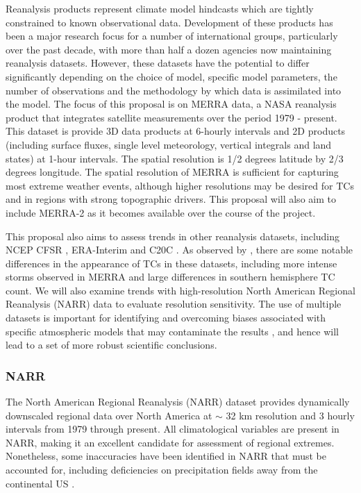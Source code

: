 \documentclass[11pt]{article}
\begin{document}
Reanalysis products represent climate model hindcasts which are tightly constrained to known observational data.  Development of these products has been a major research focus for a number of international groups, particularly over the past decade, with more than half a dozen agencies now maintaining reanalysis datasets.  However, these datasets have the potential to differ significantly depending on the choice of model, specific model parameters, the number of observations and the methodology by which data is assimilated into the model.  The focus of this proposal is on MERRA \citep{rienecker2011merra} data, a NASA reanalysis product that integrates satellite measurements over the period 1979 - present.  This dataset is provide 3D data products at 6-hourly intervals and 2D products (including surface fluxes, single level meteorology, vertical integrals and land states) at 1-hour intervals.  The spatial resolution is 1/2 degrees latitude by 2/3 degrees longitude.  The spatial resolution of MERRA is sufficient for capturing most extreme weather events, although higher resolutions may be desired for TCs and in regions with strong topographic drivers.  This proposal will also aim to include MERRA-2 as it becomes available over the course of the project.

This proposal also aims to assess trends in other reanalysis datasets, including NCEP CFSR \citep{saha2010ncep}, ERA-Interim \citep{simmons2007era} and C20C \citep{compo2011twentieth}.  As observed by \cite{hodges2011comparison}, there are some notable differences in the appearance of TCs in these datasets, including more intense storms observed in MERRA and large differences in southern hemisphere TC count.  We will also examine trends with high-resolution North American Regional Reanalysis (NARR) data to evaluate resolution sensitivity.  The use of multiple datasets is important for identifying and overcoming biases associated with specific atmospheric models that may contaminate the results \citep{jun2008spatial}, and hence will lead to a set of more robust scientific conclusions.

\subsubsection*{NARR} \label{sec:NARR}

The North American Regional Reanalysis (NARR) dataset \citep{mesinger2006north} provides dynamically downscaled regional data over North America at $\sim$ 32 km resolution and 3 hourly intervals from 1979 through present.  All climatological variables are present in NARR, making it an excellent candidate for assessment of regional extremes.  Nonetheless, some inaccuracies have been identified in NARR that must be accounted for, including deficiencies on precipitation fields away from the continental US \citep{bukovsky2007brief}.
\end{document}
